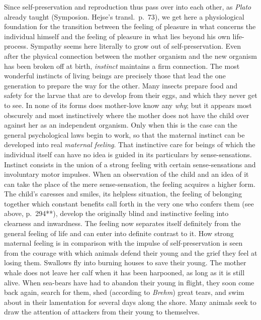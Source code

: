 \documentclass[12pt,a4paper]{book}
\newcommand{\opage}[1]{\marginnote{\footnotesize\textit{[#1]}}}
\begin{document}
\opage{298}Since self-preservation and reproduction thus pass over into
each other, as \emph{Plato} already taught (Symposion. Hejse's transl.\
p.~73), we get here a physiological foundation for the transition
between the feeling of pleasure in what concerns the individual himself
and the feeling of pleasure in what lies beyond his own life-process.
Sympathy seems here literally to grow out of self-preservation. Even
after the physical connection between the mother organism and the new
organism has been broken off at birth, \emph{instinct} maintains a firm
connection. The most wonderful instincts of living beings are precisely
those that lead the one generation to prepare the way for the other.
Many insects prepare food and safety for the larvae that are to develop
from their eggs, and which they never get to see. In none of its forms
does mother-love know any \emph{why}; but it appears most obscurely and
most instinctively where the mother does not have the child over against
her as an independent organism. Only when this is the case can the
general psychological laws begin to work, so that the maternal instinct
can be developed into real \emph{maternal feeling}. That instinctive
care for beings of which the individual itself can have no idea is
guided in its particulars by sense-sensations. Instinct consists in the
union of a strong feeling with certain sense-sensations and involuntary
motor impulses. When an observation of the child and an idea of it can
take the place of the mere sense-sensation, the feeling acquires a
higher form. The child's caresses and smiles, its helpless situation,
the feeling of belonging together which constant benefits call forth in
the very one who confers them (see above, p.~294**), develop the
originally blind and instinctive feeling into clearness and inwardness.
The feeling now separates itself definitely from the general feeling of
life and can enter into definite contrast to it. How strong maternal
feeling is in comparison with the impulse of self-preservation is seen
from the courage with which animals defend their young and the grief
they feel at losing them. Swallows fly into burning houses to save their
young. The mother whale does not leave her calf when it has been
harpooned, as long as it is still alive. When sea-bears have had to
abandon their young in flight, they soon come back again, search for
them, shed (according to
\opage{299}\emph{Brehm}) great tears, and swim about in their
lamentation for several days along the shore. Many animals seek to draw
the attention of attackers from their young to themselves.
\end{document}
